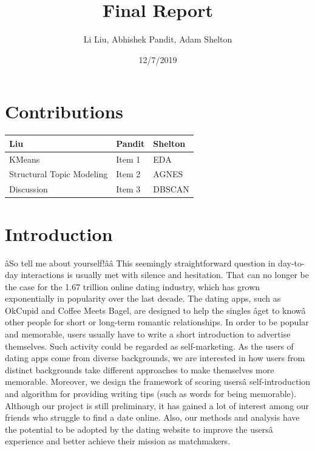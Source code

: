 \documentclass[]{article}
\title{Final Report}
\author{Li Liu, Abhishek Pandit, Adam Shelton}
\date{12/7/2019}
\begin{document}
\maketitle

{
\setcounter{tocdepth}{1}
\tableofcontents
}
\hypertarget{contributions}{%
\section{Contributions}\label{contributions}}

\begin{table}[H]
\centering
\begin{tabular}{l|l|l}
\hline
\textbf{Liu} & \textbf{Pandit} & \textbf{Shelton}\\
\hline
KMeans & Item 1 & EDA\\
\hline
Structural Topic Modeling & Item 2 & AGNES\\
\hline
Discussion & Item 3 & DBSCAN\\
\hline
\end{tabular}
\end{table}

\newpage

\hypertarget{introduction}{%
\section{Introduction}\label{introduction}}

âSo tell me about yourself!ââ This seemingly straightforward
question in day-to-day interactions is usually met with silence and
hesitation. That can no longer be the case for the 1.67 trillion online
dating industry, which has grown exponentially in popularity over the
last decade. The dating apps, such as OkCupid and Coffee Meets Bagel,
are designed to help the singles âget to knowâ other people for
short or long-term romantic relationships. In order to be popular and
memorable, users usually have to write a short introduction to advertise
themselves. Such activity could be regarded as self-marketing. As the
users of dating apps come from diverse backgrounds, we are interested in
how users from distinct backgrounds take different approaches to make
themselves more memorable. Moreover, we design the framework of scoring
usersâ self-introduction and algorithm for providing writing tips
(such as words for being memorable). Although our project is still
preliminary, it has gained a lot of interest among our friends who
struggle to find a date online. Also, our methods and analysis have the
potential to be adopted by the dating website to improve the usersâ
experience and better achieve their mission as matchmakers.
\end{document}
